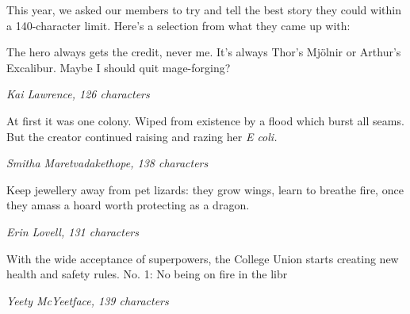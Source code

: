 
\newcommand{\microfiction}[3]{
  \vspace{\baselineskip}
  {\Large #2} \\[-0.6em] \begin{flushright}
    \textemdash{} \textit{#1, #3 characters}
  \end{flushright}
  \vspace{\baselineskip}
}

\begin{center}

  \begin{minipage}{0.72\textwidth}

    \vspace{1\baselineskip}

    This year, we asked our members to try and tell the best story
    they could within a 140-character limit. Here's a selection from
    what they came up with:

    \shorthline
    \microfiction{Kai Lawrence}{ The hero always gets the credit, never
      me. It's always Thor's Mjölnir or Arthur's Excalibur. Maybe I should
      quit mage-forging?}{126}

    \shorthline
    \microfiction{Smitha Maretvadakethope}{At first it was one
      colony. Wiped from existence by a flood which burst all seams. But
      the creator continued raising and razing her \textit{E coli.}}{138}

    \shorthline
    \microfiction{Erin Lovell}{Keep jewellery away from pet lizards: they
      grow wings, learn to breathe fire, once they amass a hoard worth
      protecting as a dragon.}{131}

    \shorthline
    \microfiction{Yeety McYeetface\footnotemark}{With the wide acceptance of
      superpowers, the College Union starts creating new health
      and safety rules. No. 1: No being on fire in the libr}{139}

  \end{minipage}
\end{center}

